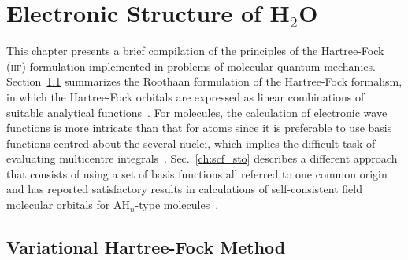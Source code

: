 \chapter{Electronic Structure of H$_{2}$O}
\label{cha:scf_h2o}





This chapter presents a brief compilation of the principles of the
Hartree-Fock (\textsc{hf}) formulation implemented in problems of
molecular quantum mechanics. Section~\ref{ch:var_hf} summarizes the
Roothaan formulation of the Hartree-Fock formalism, in which the
Hartree-Fock orbitals are expressed as linear combinations of suitable
analytical functions~\cite{Roothaan_HF}. For molecules, the
calculation of electronic wave functions is more intricate than that
for atoms since it is preferable to use basis functions centred about
the several nuclei, which implies the difficult task of evaluating
multicentre
integrals~\cite{Pitzer_1968,Pitzer_1970}. Sec.~\ref{ch:scf_sto}
describes a different approach that consists of using a set of basis
functions all referred to one common origin and has reported
satisfactory results in calculations of self-consistent field
molecular orbitals for AH$_{n}$-type molecules~\cite{Moccia_JCP_2164,
  Moccia_1964}.


\section{Variational Hartree-Fock Method}
\label{ch:var_hf}







